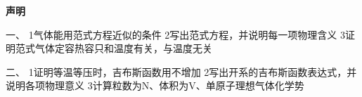 
\item \textbf{声明}



一、
{1}气体能用范式方程近似的条件
{2}写出范式方程，并说明每一项物理含义
{3}证明范式气体定容热容只和温度有关，与温度无关

二、
{1}证明等温等压时，吉布斯函数用不增加
{2}写出开系的吉布斯函数表达式，并说明各项物理意义
{3}计算粒数为N、体积为V、单原子理想气体化学势